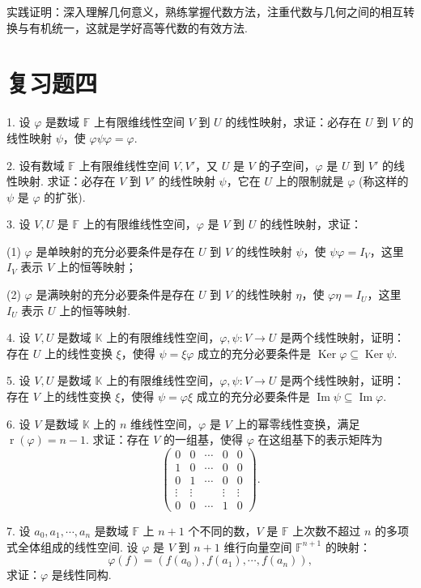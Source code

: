 \documentclass[UTF8, 12pt, fontset=fandol, oneside]{ctexart}
\begin{document}
实践证明：深入理解几何意义，熟练掌握代数方法，注重代数与几何之间的相互转换与有机统一，这就是学好高等代数的有效方法.

\section*{复习题四}

1. 设 $\varphi$ 是数域 $\mathbb{F}$ 上有限维线性空间 $V$ 到 $U$ 的线性映射，求证：必存在 $U$ 到 $V$ 的线性映射 $\psi$，使 $\varphi\psi\varphi=\varphi$.

2. 设有数域 $\mathbb{F}$ 上有限维线性空间 $V,V'$，又 $U$ 是 $V$ 的子空间，$\varphi$ 是 $U$ 到 $V'$ 的线性映射. 求证：必存在 $V$ 到 $V'$ 的线性映射 $\psi$，它在 $U$ 上的限制就是 $\varphi$ (称这样的 $\psi$ 是 $\varphi$ 的扩张).

3. 设 $V,U$ 是 $\mathbb{F}$ 上的有限维线性空间，$\varphi$ 是 $V$ 到 $U$ 的线性映射，求证：

(1) $\varphi$ 是单映射的充分必要条件是存在 $U$ 到 $V$ 的线性映射 $\psi$，使 $\psi\varphi=I_V$，这里 $I_V$ 表示 $V$ 上的恒等映射；

(2) $\varphi$ 是满映射的充分必要条件是存在 $U$ 到 $V$ 的线性映射 $\eta$，使 $\varphi\eta=I_U$，这里 $I_U$ 表示 $U$ 上的恒等映射.

4. 设 $V,U$ 是数域 $\mathbb{K}$ 上的有限维线性空间，$\varphi,\psi:V\to U$ 是两个线性映射，证明：存在 $U$ 上的线性变换 $\xi$，使得 $\psi=\xi\varphi$ 成立的充分必要条件是 $\operatorname{Ker}\varphi\subseteq\operatorname{Ker}\psi$.

5. 设 $V,U$ 是数域 $\mathbb{K}$ 上的有限维线性空间，$\varphi,\psi:V\to U$ 是两个线性映射，证明：存在 $V$ 上的线性变换 $\xi$，使得 $\psi=\varphi\xi$ 成立的充分必要条件是 $\operatorname{Im}\psi\subseteq\operatorname{Im}\varphi$.

6. 设 $V$ 是数域 $\mathbb{K}$ 上的 $n$ 维线性空间，$\varphi$ 是 $V$ 上的幂零线性变换，满足 $\operatorname{r}(\varphi)=n-1$. 求证：存在 $V$ 的一组基，使得 $\varphi$ 在这组基下的表示矩阵为
\[
\left(\begin{array}{ccccc}
0&0&\cdots&0&0\\
1&0&\cdots&0&0\\
0&1&\cdots&0&0\\
\vdots&\vdots&&\vdots&\vdots\\
0&0&\cdots&1&0
\end{array}\right).
\]

7. 设 $a_0,a_1,\cdots,a_n$ 是数域 $\mathbb{F}$ 上 $n+1$ 个不同的数，$V$ 是 $\mathbb{F}$ 上次数不超过 $n$ 的多项式全体组成的线性空间. 设 $\varphi$ 是 $V$ 到 $n+1$ 维行向量空间 $\mathbb{F}^{n+1}$ 的映射：
\[
\varphi(f)=(f(a_0),f(a_1),\cdots,f(a_n)),
\]
求证：$\varphi$ 是线性同构.
\end{document}
